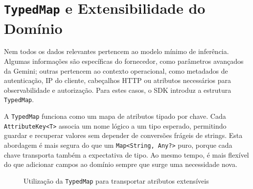 \documentclass[11pt,a4paper]{report}
\begin{document}
    \section{\texttt{TypedMap} e Extensibilidade do Domínio}
    Nem todos os dados relevantes pertencem ao modelo mínimo de inferência. Algumas informações são específicas do fornecedor, como parâmetros avançados da Gemini; outras pertencem ao contexto operacional, como metadados de autenticação, IP do cliente, cabeçalhos HTTP ou atributos necessários para observabilidade e autorização. Para estes casos, o SDK introduz a estrutura \texttt{TypedMap}.

    A \texttt{TypedMap} funciona como um mapa de atributos tipado por chave. Cada \texttt{AttributeKey<T>} associa um nome lógico a um tipo esperado, permitindo guardar e recuperar valores sem depender de conversões frágeis de strings. Esta abordagem é mais segura do que um \texttt{Map<String, Any?>} puro, porque cada chave transporta também a expectativa de tipo. Ao mesmo tempo, é mais flexível do que adicionar campos ao domínio sempre que surge uma necessidade nova.

    \begin{figure}[H]
        \centering
        \caption{Utilização da \texttt{TypedMap} para transportar atributos extensíveis}
        \label{fig:typed-map}
    \end{figure}
\end{document}
